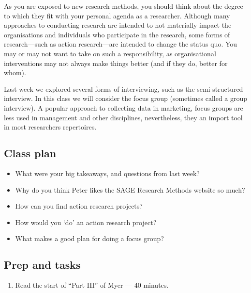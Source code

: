 \documentclass[]{book}
\providecommand{\tightlist}{%
  \setlength{\itemsep}{0pt}\setlength{\parskip}{0pt}}
\theoremstyle{definition}
\theoremstyle{definition}
\theoremstyle{definition}
\theoremstyle{remark}
\begin{document}
As you are exposed to new research methods, you should think about the
degree to which they fit with your personal agenda as a researcher.
Although many approaches to conducting research are intended to not
materially impact the organisations and individuals who participate in
the research, some forms of research---such as action research---are
intended to change the status quo. You may or may not want to take on
such a responsibility, as organisational interventions may not always
make things better (and if they do, better for whom).

Last week we explored several forms of interviewing, such as the
semi-structured interview. In this class we will consider the focus
group (sometimes called a group interview). A popular approach to
collecting data in marketing, focus groups are less used in management
and other disciplines, nevertheless, they an import tool in most
researchers repertoires.

\hypertarget{class-plan-2}{%
\subsection*{Class plan}\label{class-plan-2}}

\begin{itemize}
\item
  What were your big takeaways, and questions from last week?
\item
  Why do you think Peter likes the SAGE Research Methods website so
  much?
\item
  How can you find action research projects?
\item
  How would you `do' an action research project?
\item
  What makes a good plan for doing a focus group?
\end{itemize}

\hypertarget{prep-and-tasks-2}{%
\subsection*{Prep and tasks}\label{prep-and-tasks-2}}

\begin{enumerate}
\def\labelenumi{\arabic{enumi}.}
\tightlist
\item
  Read the start of ``Part III'' of Myer \autocite*[
  p.~57--72]{myers_2013_qualitativeresearchbusiness} --- 40 minutes.
\end{enumerate}
\end{document}

